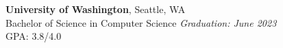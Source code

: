 \textbf{University of Washington}, Seattle, WA \\
Bachelor of Science in Computer Science \hfill \textit{Graduation: June 2023} \\
GPA: 3.8/4.0 \\[0.5em]